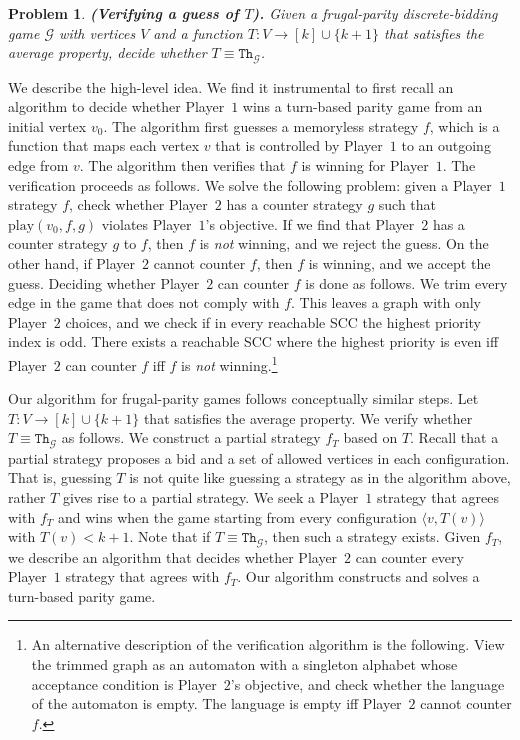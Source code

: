 \documentclass{article}\providecommand{\nequiv}{\not\equiv}\usepackage[a4paper,margin=20mm]{geometry}
\newcommand{\PO}{Player~$1$\xspace}
\newcommand{\PT}{Player~$2$\xspace}
\newcommand{\G}{{\mathcal G}}
\newcommand{\thresh}{\texttt{Th}\xspace}
\newcommand{\play}{\text{play}\xspace}
\newcommand{\zug}[1]{\langle #1  \rangle}
\newtheorem{problem}{Problem}
\begin{document}
\begin{problem}
\label{prob:thresh-equiv}
{\bf (Verifying a guess of $T$).} Given a frugal-parity discrete-bidding game $\G$ with vertices $V$ and a function \(T : V \rightarrow [k] \cup \{k+1\}\) that satisfies the average property, decide whether \(T \equiv \thresh_\G\).
\end{problem}


We describe the high-level idea. We find it instrumental to first recall an \NP algorithm to decide whether \PO wins a turn-based parity game from an initial vertex $v_0$. %
The algorithm first guesses a memoryless strategy $f$, which is a function that maps each vertex $v$ that is controlled by \PO to an outgoing edge from $v$. The algorithm then verifies that $f$ is winning for \PO. 
The verification proceeds as follows. We solve the following problem: given a \PO strategy $f$, check whether \PT has a counter strategy $g$ such that $\play(v_0, f, g)$ violates \PO's objective. If we find that \PT has a counter strategy $g$ to $f$, then $f$ is {\em not} winning, and we reject the guess. On the other hand, if \PT cannot counter $f$, then $f$ is winning, and we accept the guess. Deciding whether \PT can counter $f$ is done as follows. We trim every edge in the game that does not comply with $f$. This leaves a graph with only \PT choices, and we check if in every reachable SCC the highest priority index is odd. 
There exists a reachable SCC where the highest priority is even iff \PT can counter $f$ iff $f$ is {\em not} winning.\footnote{An alternative description of the verification algorithm is the following. View the trimmed graph as an automaton with a singleton alphabet whose acceptance condition is \PT's objective, and check whether the language of the automaton is empty. The language is empty iff \PT cannot counter $f$.} 


Our algorithm for frugal-parity games follows conceptually similar steps. Let \(T : V \rightarrow [k] \cup \{k+1\}\) that satisfies the average property. 
We verify whether \(T \equiv \thresh_\G\) as follows. We construct a partial strategy $f_T$ based on $T$. Recall that a partial strategy proposes a bid and a set of allowed vertices in each configuration. That is, guessing $T$ is not quite like guessing a strategy as in the algorithm above, rather $T$ gives rise to a partial strategy. 
We seek a \PO strategy that agrees with $f_T$ and wins when the game starting from every configuration $\zug{v, T(v)}$ with $T(v) < k+1$. 
Note that if $T \equiv \thresh_\G$, then such a strategy exists. 
Given $f_T$, we describe an algorithm that decides whether \PT can counter every \PO strategy that agrees with $f_T$. Our algorithm constructs and solves a turn-based parity game. 
\end{document}
